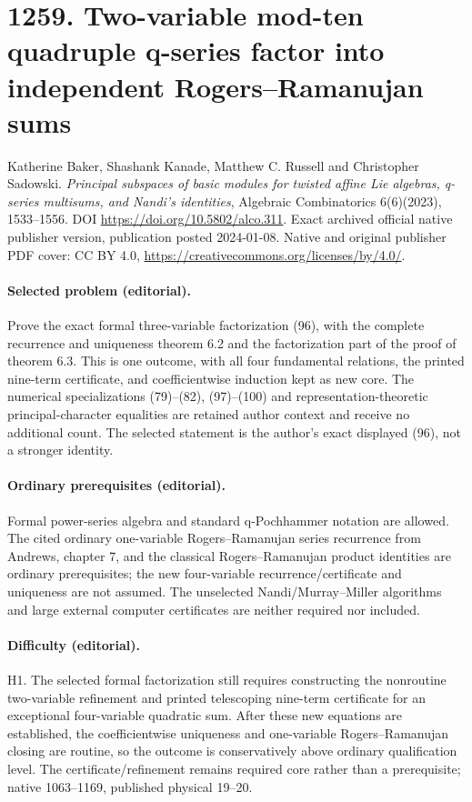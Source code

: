 \documentclass[10pt]{article}
\begin{document}
\section*{1259. Two-variable mod-ten quadruple q-series factor into independent Rogers--Ramanujan sums}
Katherine Baker, Shashank Kanade, Matthew C. Russell and Christopher Sadowski. \emph{Principal subspaces of basic modules for twisted affine Lie algebras, q-series multisums, and Nandi's identities}, Algebraic Combinatorics 6(6)(2023), 1533--1556. DOI \url{https://doi.org/10.5802/alco.311}. Exact archived official native publisher version, publication posted 2024-01-08. Native and original publisher PDF cover: CC BY 4.0, \url{https://creativecommons.org/licenses/by/4.0/}.
\paragraph{Selected problem (editorial).} Prove the exact formal three-variable factorization (96), with the complete recurrence and uniqueness theorem 6.2 and the factorization part of the proof of theorem 6.3. This is one outcome, with all four fundamental relations, the printed nine-term certificate, and coefficientwise induction kept as new core. The numerical specializations (79)--(82), (97)--(100) and representation-theoretic principal-character equalities are retained author context and receive no additional count. The selected statement is the author's exact displayed (96), not a stronger identity.
\paragraph{Ordinary prerequisites (editorial).} Formal power-series algebra and standard q-Pochhammer notation are allowed. The cited ordinary one-variable Rogers--Ramanujan series recurrence from Andrews, chapter 7, and the classical Rogers--Ramanujan product identities are ordinary prerequisites; the new four-variable recurrence/certificate and uniqueness are not assumed. The unselected Nandi/Murray--Miller algorithms and large external computer certificates are neither required nor included.
\paragraph{Difficulty (editorial).} H1. The selected formal factorization still requires constructing the nonroutine two-variable refinement and printed telescoping nine-term certificate for an exceptional four-variable quadratic sum. After these new equations are established, the coefficientwise uniqueness and one-variable Rogers--Ramanujan closing are routine, so the outcome is conservatively above ordinary qualification level. The certificate/refinement remains required core rather than a prerequisite; native 1063--1169, published physical 19--20.
\end{document}
